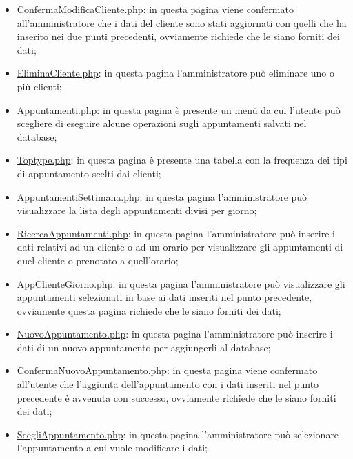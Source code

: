 {\begin{itemize}
		\item \underline{ConfermaModificaCliente.php}: in questa pagina viene confermato all'amministratore che i dati del cliente sono stati aggiornati con quelli che ha inserito nei due punti precedenti, ovviamente richiede che le siano forniti dei dati;
		\item \href{http://tecweb2016.studenti.math.unipd.it/smarches/EliminaCliente.php}{EliminaCliente.php}: in questa pagina l'amministratore può eliminare uno o più clienti;
		\item \href{http://tecweb2016.studenti.math.unipd.it/smarches/Appuntamenti.php}{Appuntamenti.php}: in questa pagina è presente un menù da cui l'utente può scegliere di eseguire alcune operazioni sugli appuntamenti salvati nel database;
		\item \href{http://tecweb2016.studenti.math.unipd.it/smarches/Toptype.php}{Toptype.php}: in questa pagina è presente una tabella con la frequenza dei tipi di appuntamento scelti dai clienti;
		\item \href{http://tecweb2016.studenti.math.unipd.it/smarches/AppuntamentiSettimana.php}{AppuntamentiSettimana.php}: in questa pagina l'amministratore può visualizzare la lista degli appuntamenti divisi per giorno;
		\item \href{http://tecweb2016.studenti.math.unipd.it/smarches/RicercaAppuntamenti.php}{RicercaAppuntamenti.php}: in questa pagina l'amministratore può inserire i dati relativi ad un cliente o ad un orario per visualizzare gli appuntamenti di quel cliente o prenotato a quell'orario;
		\item \underline{AppClienteGiorno.php}: in questa pagina l'amministratore può visualizzare gli appuntamenti selezionati in base ai dati inseriti nel punto precedente, ovviamente questa pagina richiede che le siano forniti dei dati;
		\item \href{http://tecweb2016.studenti.math.unipd.it/smarches/NuovoAppuntamento.php}{NuovoAppuntamento.php}: in questa pagina l'amministratore può inserire i dati di un nuovo appuntamento per aggiungerli al database;
		\item \underline{ConfermaNuovoAppuntamento.php}: in questa pagina viene confermato all'utente che l'aggiunta dell'appuntamento con i dati inseriti nel punto precedente è avvenuta con successo, ovviamente richiede che le siano forniti dei dati;
		\item \href{http://tecweb2016.studenti.math.unipd.it/smarches/ScegliAppuntamento.php}{ScegliAppuntamento.php}: in questa pagina l'amministratore può selezionare l'appuntamento a cui vuole modificare i dati;

\end{itemize}}
